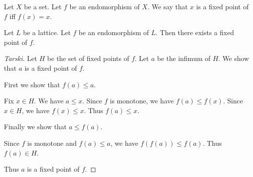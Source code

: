 \begin{definition}
  Let $X$ be a set.
  Let $f$ be an endomorphism of $X$.
  We say that $x$ is a fixed point of $f$ iff $f(x) = x$.
\end{definition}


\begin{theorem}[Tarski]
  Let $L$ be a lattice.
  Let $f$ be an endomorphism of $L$.
  Then there exists a fixed point of $f$.
\end{theorem}

%
\begin{proof}[Tarski]
  Let $H$ be the set of fixed points of $f$.
  Let $a$ be the infimum of $H$.
  We show that $a$ is a fixed point of $f$.

    First we show that $f(a) ≤ a$.

      Fix $x ∈ H$.
      We have $a ≤ x$. %
      Since $f$ is monotone, we have $f(a) ≤ f(x)$.
      Since $x ∈ H$, we have $f(x) ≤ x$.
      Thus $f(a) ≤ x$.

    Finally we show that $a ≤ f(a)$.

      Since $f$ is monotone and $f(a) ≤ a$, we have $f(f(a)) ≤ f(a)$.
      Thus $f(a) ∈ H$.

    Thus $a$ is a fixed point of $f$.
\end{proof}
